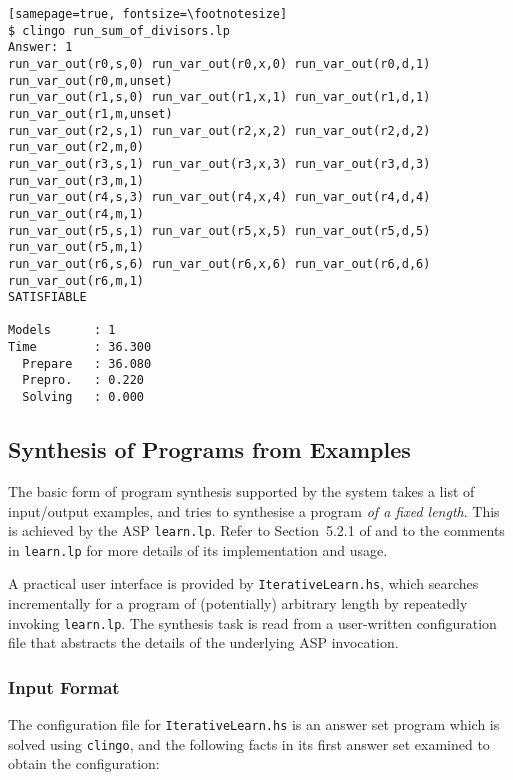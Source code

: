 \documentclass[a4paper,twoside,notitlepage,12pt]{article}
\begin{document}
\begin{verbatim}[samepage=true, fontsize=\footnotesize]
$ clingo run_sum_of_divisors.lp
Answer: 1
run_var_out(r0,s,0) run_var_out(r0,x,0) run_var_out(r0,d,1) run_var_out(r0,m,unset)
run_var_out(r1,s,0) run_var_out(r1,x,1) run_var_out(r1,d,1) run_var_out(r1,m,unset)
run_var_out(r2,s,1) run_var_out(r2,x,2) run_var_out(r2,d,2) run_var_out(r2,m,0)
run_var_out(r3,s,1) run_var_out(r3,x,3) run_var_out(r3,d,3) run_var_out(r3,m,1)
run_var_out(r4,s,3) run_var_out(r4,x,4) run_var_out(r4,d,4) run_var_out(r4,m,1)
run_var_out(r5,s,1) run_var_out(r5,x,5) run_var_out(r5,d,5) run_var_out(r5,m,1)
run_var_out(r6,s,6) run_var_out(r6,x,6) run_var_out(r6,d,6) run_var_out(r6,m,1)
SATISFIABLE

Models      : 1     
Time        : 36.300
  Prepare   : 36.080
  Prepro.   : 0.220
  Solving   : 0.000
\end{verbatim}

\subsection{Synthesis of Programs from Examples} \label{sec:syx}

The basic form of program synthesis supported by the system takes a list of 
input/output examples, and tries to synthesise a program \emph{of a fixed length}.
This is achieved by the ASP \verb|learn.lp|. Refer to Section~5.2.1 of 
\cite{final} and to the comments in \verb|learn.lp| for more details of its 
implementation and usage.

A practical user interface is provided by \verb|IterativeLearn.hs|, which 
searches incrementally for a program of (potentially) arbitrary length by 
repeatedly invoking \verb|learn.lp|. The synthesis task is read from a 
user-written configuration file that abstracts the details of the underlying 
ASP invocation.

\subsubsection{Input Format} \label{sec:syx:inp}

The configuration file for \verb|IterativeLearn.hs| is an answer set program 
which is solved using \verb|clingo|, and the following facts in its first 
answer set examined to obtain the configuration:
\end{document}
